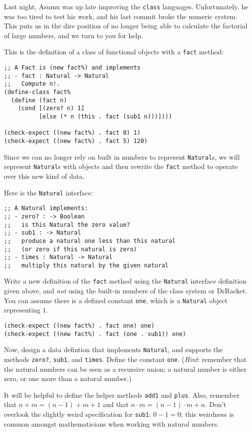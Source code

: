 \documentclass[12pt]{article}                   %
\def\pts#1{\marginpar{\footnotesize \raggedright  \fbox{#1 {\sc Points}}}}
\begin{document}
\begin{problem} \pts{18}
Last night, Asumu was up late improving the {\tt class} languages.
Unfortunately, he was too tired to test his work, and his last commit
broke the numeric system.
%
This puts us in the dire position of no longer being able to calculate
the factorial of large numbers, and we turn to you for help.

This is the definition of a class of functional objects
with a {\tt fact} method:

\begin{verbatim}
;; A Fact is (new fact%) and implements 
;; - fact : Natural -> Natural
;;   Compute n!.
(define-class fact%
  (define (fact n)
    (cond [(zero? n) 1]
          [else (* n (this . fact (sub1 n)))])))

(check-expect ((new fact%) . fact 0) 1)
(check-expect ((new fact%) . fact 5) 120)
\end{verbatim}

Since we can no longer rely on built in numbers to represent
\verb|Natural|s, we will represent \verb|Natural|s with objects and
then rewrite the \verb|fact| method to operate over this new kind of
data.

Here is the \verb|Natural| interface:

\begin{verbatim}
;; A Natural implements:
;; - zero? : -> Boolean
;;   is this Natural the zero value?
;; - sub1 : -> Natural
;;   produce a natural one less than this natural 
;;   (or zero if this natural is zero)
;; - times : Natural -> Natural
;;   multiply this natural by the given natural
\end{verbatim}

\newpage
Write a new definition of the \verb|fact| method using the
\verb|Natural| interface definition given above, and \emph{not} using
the built-in numbers of the class system or DrRacket.  You can assume
there is a defined constant \verb|one|, which is a \verb|Natural|
object representing $1$.

\begin{verbatim}
(check-expect ((new fact%) . fact one) one)
(check-expect ((new fact%) . fact (one . sub1)) one)
\end{verbatim}

\newpage

Now, design a data defintion that implements \verb|Natural|, and
supports the methods \verb|zero?|, \verb|sub1|, and \verb|times|.
Define the constant \verb|one|.  (\emph{Hint}: remember that the
natural numbers can be seen as a recursive union; a natural number is
either zero, or one more than a natural number.)

It will be helpful to define the helper methods \verb|add1| and
\verb|plus|.  Also, remember that $n + m = (n-1) + m + 1$ and that $n
\cdot m = (n-1) \cdot m + n$.  Don't overlook the slightly weird
specification for \verb|sub1|: $0-1 = 0$; this weirdness is common
amongst mathematicians when working with natural numbers.

\ifrubric
\else
{}
\newpage
\fi
\end{problem}
\end{document}
